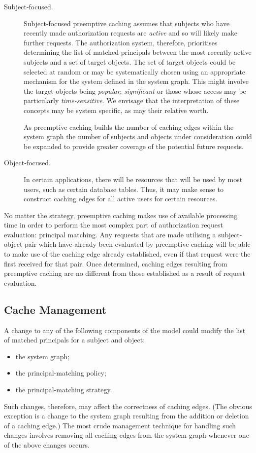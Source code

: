 \documentclass{article}
\begin{document}
\begin{description}
    \item[Subject-focused.]
    Subject-focused preemptive caching assumes that subjects who have recently made authorization requests are \emph{active} and so will likely make further requests.
    The authorization system, therefore, prioritises determining the list of matched principals between the most recently active subjects and a set of target objects.
    The set of target objects could be selected at random or may be systematically chosen using an appropriate mechanism for the system defined in the system graph.
    This might involve the target objects being \emph{popular}, \emph{significant} or those whose access may be particularly \emph{time-sensitive}.
    We envisage that the interpretation of these concepts may be system specific, as may their relative worth.

    As preemptive caching builds the number of caching edges within the system graph the number of subjects and objects under consideration could be expanded to provide greater coverage of the potential future requests.

   \item[Object-focused.]
   In certain applications, there will be resources that will be used by most users, such as certain database tables.
   Thus, it may make sense to construct caching edges for all active users for certain resources.
\end{description}

No matter the strategy, preemptive caching makes use of available processing time in order to perform the most complex part of authorization request evaluation: principal matching.
Any requests that are made utilising a subject-object pair which have already been evaluated by preemptive caching will be able to make use of the caching edge already established, even if that request were the first received for that pair.
Once determined, caching edges resulting from preemptive caching are no different from those established as a result of request evaluation.

\subsection{Cache Management}\label{sec:caching:management}
A change to any of the following components of the model could modify the list of matched principals for a subject and object:
\begin{itemize}
    \item the system graph;
    \item the principal-matching policy;
    \item the principal-matching strategy.
\end{itemize}
Such changes, therefore, may affect the correctness of caching edges.
(The obvious exception is a change to the system graph resulting from the addition or deletion of a caching edge.)
The most crude management technique for handling such changes involves removing all caching edges from the system graph whenever one of the above changes occurs.
\end{document}
